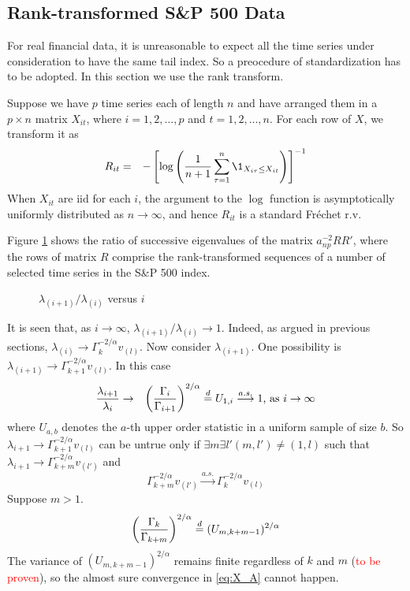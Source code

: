 \subsection{Rank-transformed S\&P 500 Data}

For real financial data, it is unreasonable to expect all
the time series under consideration to have the same tail index. So a
preocedure of standardization has to be adopted. In this section we
use the rank transform.

Suppose we have $p$ time series each of length $n$ and have arranged
them in a $p\times n$ matrix $X_{it}$, where $i = 1, 2, \dots, p$ and
$t=1,2, \dots, n$. For each row of $X$, we transform it as
\begin{eqnarray*}
  R_{it} &=& -\left[
    \log \left({1 \over n+1} \sum_{\tau=1}^n \1_{X_{i\tau} \leq X_{it}} \right)
  \right]^{-1}
\end{eqnarray*}
When $X_{it}$ are iid for each $i$, the argument to the $\log$
function is asymptotically uniformly distributed as $n \to \infty$,
and hence $R_{it}$ is a standard Fr\'echet r.v.

Figure \ref{fig:EigenRatio} shows the ratio of successive eigenvalues
of the matrix $a_{np}^{-2}RR'$, where the rows of matrix $R$ comprise
the rank-transformed sequences of a number of selected time series
in the S\&P 500 index.
\begin{figure}[htb!]
  \centering
  \caption{$\lambda_{(i+1)} / \lambda_{(i)}$ versus $i$}
  \label{fig:EigenRatio}
\end{figure}
It is seen that, as $i \to \infty$, $\lambda_{(i+1)} / \lambda_{(i)}
\to 1$. Indeed, as argued in previous sections, $ \lambda_{(i)} \to
\Gamma_k^{-2/\alpha} v_{(l)}$.  Now consider $\lambda_{(i+1)}$. One
possibility is $\lambda_{(i+1)} \to \Gamma_{k+1}^{-2/\alpha}
v_{(l)}$. In this case
\begin{eqnarray*}
  {\lambda_{i+1} \over \lambda_{i}} &\to& \left(
    \Gamma_{i} \over \Gamma_{i+1} \right)^{2/\alpha}
  \overset{d}{=} U_{1,i} \overset{a.s.}{\longrightarrow} 1\text{, as }i
  \to \infty
\end{eqnarray*}
where $U_{a,b}$ denotes the $a$-th upper order statistic in a uniform
sample of size $b$.
So $ \lambda_{i+1} \to \Gamma_{k+1}^{-2/\alpha} v_{(l)}$ can be untrue
only if $\exists m\exists l'(m,l') \neq (1, l)$ such that $ \lambda_{i+1} \to
\Gamma_{k+m}^{-2/\alpha} v_{(l')}$ and
\begin{equation}
  \label{eq:X_A}
  \Gamma_{k+m}^{-2/\alpha} v_{(l')} \overset{a.s.}{\longrightarrow}
  \Gamma_{k}^{-2/\alpha} v_{(l)}
\end{equation}
Suppose $m > 1$.
\[
\left(
  \Gamma_{k} \over \Gamma_{k+m}
\right)^{2/\alpha} \overset{d}{=} (U_{m,k+m-1})^{2/\alpha}
\]
The variance of $(U_{m,k+m-1})^{2/\alpha}$ remains finite regardless
of $k$ and $m$ (\textcolor{red}{to be proven}), so the almost sure
convergence in \eqref{eq:X_A} cannot happen.
